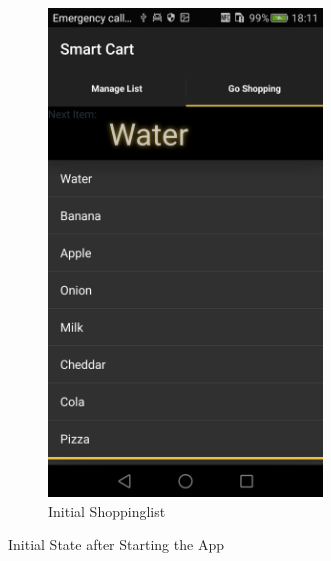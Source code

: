 \begin{figure}[h]
\begin{subfigure}{0.475\textwidth}
\includegraphics[width=0.8\textwidth, height=
0.35\textheight]{res/usermanual/initialShoppinglist.png}
\caption{Initial Shoppinglist}
\label{fig:initial}
\end{subfigure}
\caption{Initial State after Starting the App}
\label{fig:initialState}
\end{figure}


